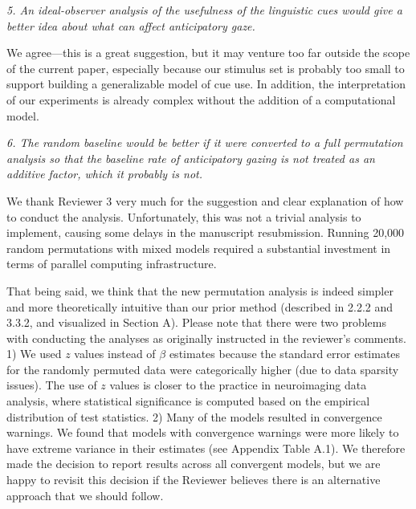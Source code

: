 \documentclass[11pt,a4paper]{letter} %
\begin{document}
\begin{letter}{}
\smallskip

\noindent \textit{5. An ideal-observer analysis of the usefulness of the linguistic cues would give a better idea about what can affect anticipatory gaze.}

\noindent We agree---this is a great suggestion, but it may venture too far outside the scope of the current paper, especially because our stimulus set is probably too small to support building a generalizable model of cue use. In addition, the interpretation of our experiments is already complex without the addition of a computational model.  

\smallskip

\noindent \textit{6. The random baseline would be better if it were converted to a full permutation analysis so that the baseline rate of anticipatory gazing is not treated as an additive factor, which it probably is not.}

\noindent We thank Reviewer 3 very much for the suggestion and clear explanation of how to conduct the analysis. Unfortunately, this was not a trivial analysis to implement, causing some delays in the manuscript resubmission. Running 20,000 random permutations with mixed models required a substantial investment in terms of parallel computing infrastructure. 

That being said, we think that the new permutation analysis is indeed simpler and more theoretically intuitive than our prior method (described in 2.2.2 and 3.3.2, and visualized in Section A). Please note that there were two problems with conducting the analyses as originally instructed in the reviewer's comments. 1) We used $z$ values instead of $\beta$ estimates because the standard error estimates for the randomly permuted data were categorically higher (due to data sparsity issues). The use of $z$ values is closer to the practice in neuroimaging data analysis, where statistical significance is computed based on the empirical distribution of test statistics. 2) Many of the models resulted in convergence warnings. We found that models with convergence warnings were more likely to have extreme variance in their estimates (see Appendix Table A.1). We therefore made the decision to report results across all convergent models, but we are happy to revisit this decision if the Reviewer believes there is an alternative approach that we should follow. 


\end{letter}
\end{document}
